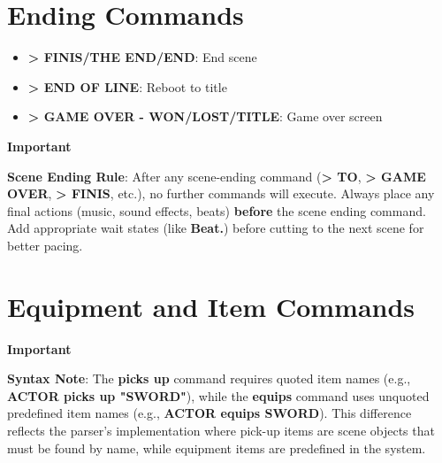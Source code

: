 \documentclass[11pt,letterpaper,oldstylefigures]{memoir}
\newenvironment{Important}
{\begingroup
\small
\setlength{\parindent}{0pt}
\setlength{\parskip}{0.5em}
\allowdisplaybreaks
\setlength{\displaywidowpenalty}{0}
\setlength{\widowpenalty}{0}
\setlength{\clubpenalty}{0}
\setlength{\interlinepenalty}{0}
\begin{tcolorbox}[
    colback=yellow!5,
    colframe=yellow!75!black,
    boxrule=0.5pt,
    arc=2pt,
    left=0.5em,
    right=0.5em,
    top=0.25em,
    bottom=0.25em
]
\textbf{Important}
\end{tcolorbox}\par
}
{\endgroup}
\newcommand{\fountain}[1]{\textbf{#1}}
\begin{document}
\section{Ending Commands}
\begin{itemize}
\item \fountain{> FINIS/THE END/END}: End scene
\item \fountain{> END OF LINE}: Reboot to title
\item \fountain{> GAME OVER - WON/LOST/TITLE}: Game over screen
\end{itemize}

\begin{Important}
\textbf{Scene Ending Rule}: After any scene-ending command (\fountain{> TO}, \fountain{> GAME OVER}, \fountain{> FINIS}, etc.), no further commands will execute. Always place any final actions (music, sound effects, beats) \textbf{before} the scene ending command. Add appropriate wait states (like \fountain{Beat.}) before cutting to the next scene for better pacing.
\end{Important}

\section{Equipment and Item Commands}
\label{sec:equipment-and-item-commands}

\begin{Important}
\textbf{Syntax Note}: The \fountain{picks up} command requires quoted item names (e.g., \fountain{ACTOR picks up "SWORD"}), while the \fountain{equips} command uses unquoted predefined item names (e.g., \fountain{ACTOR equips SWORD}). This difference reflects the parser's implementation where pick-up items are scene objects that must be found by name, while equipment items are predefined in the system.
\end{Important}
\end{document}
